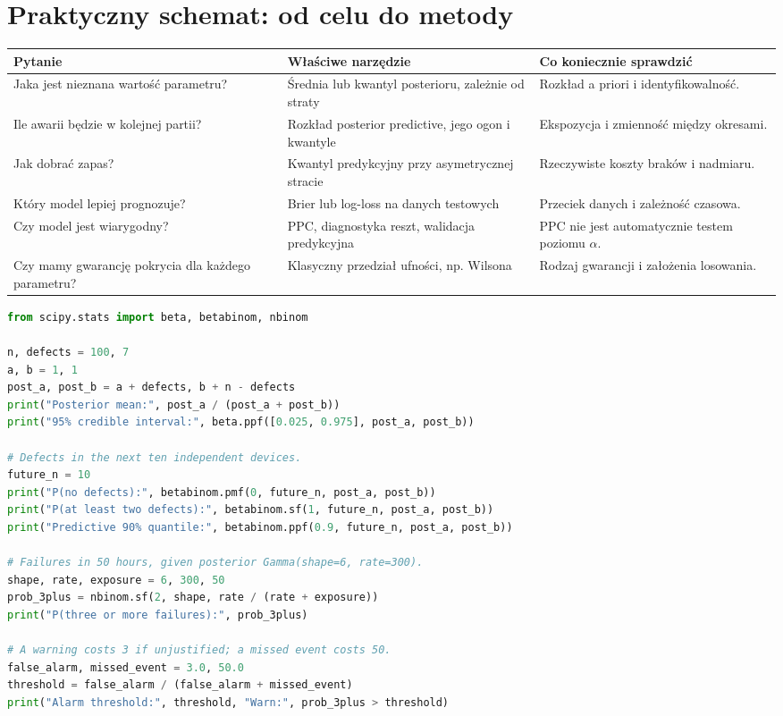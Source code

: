 \section{Praktyczny schemat: od celu do metody}
\begin{center}\small
\begin{tabular}{>{\raggedright\arraybackslash}p{}>{\raggedright\arraybackslash}p{}>{\raggedright\arraybackslash}p{}}
\toprule
\textbf{Pytanie} & \textbf{Właściwe narzędzie} & \textbf{Co koniecznie sprawdzić}\tabularnewline
\midrule
Jaka jest nieznana wartość parametru? & Średnia lub kwantyl posterioru, zależnie od straty & Rozkład a priori i identyfikowalność.\\
Ile awarii będzie w kolejnej partii? & Rozkład posterior predictive, jego ogon i kwantyle & Ekspozycja i zmienność między okresami.\\
Jak dobrać zapas? & Kwantyl predykcyjny przy asymetrycznej stracie & Rzeczywiste koszty braków i nadmiaru.\\
Który model lepiej prognozuje? & Brier lub log-loss na danych testowych & Przeciek danych i zależność czasowa.\\
Czy model jest wiarygodny? & PPC, diagnostyka reszt, walidacja predykcyjna & PPC nie jest automatycznie testem poziomu $\alpha$.\\
Czy mamy gwarancję pokrycia dla każdego parametru? & Klasyczny przedział ufności, np. Wilsona & Rodzaj gwarancji i założenia losowania.\\
\bottomrule
\end{tabular}
\end{center}

\begin{lstlisting}[language=Python,caption={Kompletny program: estymacja, predykcja, ryzyko alarmu i przedziały (Python, SciPy).}]
from scipy.stats import beta, betabinom, nbinom

n, defects = 100, 7
a, b = 1, 1
post_a, post_b = a + defects, b + n - defects
print("Posterior mean:", post_a / (post_a + post_b))
print("95% credible interval:", beta.ppf([0.025, 0.975], post_a, post_b))

# Defects in the next ten independent devices.
future_n = 10
print("P(no defects):", betabinom.pmf(0, future_n, post_a, post_b))
print("P(at least two defects):", betabinom.sf(1, future_n, post_a, post_b))
print("Predictive 90% quantile:", betabinom.ppf(0.9, future_n, post_a, post_b))

# Failures in 50 hours, given posterior Gamma(shape=6, rate=300).
shape, rate, exposure = 6, 300, 50
prob_3plus = nbinom.sf(2, shape, rate / (rate + exposure))
print("P(three or more failures):", prob_3plus)

# A warning costs 3 if unjustified; a missed event costs 50.
false_alarm, missed_event = 3.0, 50.0
threshold = false_alarm / (false_alarm + missed_event)
print("Alarm threshold:", threshold, "Warn:", prob_3plus > threshold)
\end{lstlisting}

